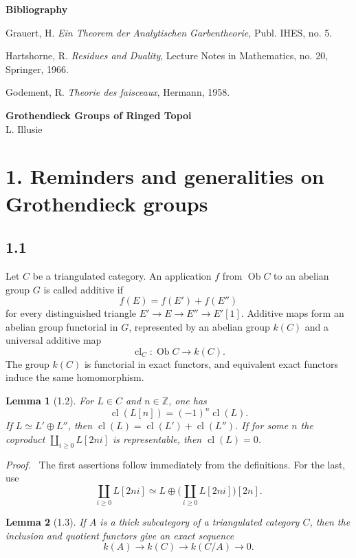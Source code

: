 \documentclass[11pt]{article}
\theoremstyle{plain}
\newtheorem*{lemma*}{Lemma}
\theoremstyle{definition}
\theoremstyle{remark}
\newenvironment{prooftext}{\par\noindent\textit{Proof.}\ }{\par\medskip}
\newcommand{\ZZ}{\mathbb Z}
\DeclareMathOperator{\ob}{Ob}
\DeclareMathOperator{\cl}{cl}
\begin{document}
\begin{center}
\textbf{Bibliography}
\end{center}
Grauert, H. \emph{Ein Theorem der Analytischen Garbentheorie}, Publ. IHES, no. 5.\par
Hartshorne, R. \emph{Residues and Duality}, Lecture Notes in Mathematics, no. 20, Springer, 1966.\par
Godement, R. \emph{Theorie des faisceaux}, Hermann, 1958.

\newpage
\begin{center}
{\Large\textbf{Grothendieck Groups of Ringed Topoi}}\\[0.35em]
{\large L. Illusie}
\end{center}

\section*{1. Reminders and generalities on Grothendieck groups}

\subsection*{1.1}
Let $C$ be a triangulated category. An application $f$ from $\ob C$ to an abelian group $G$ is called additive if
\[
f(E)=f(E')+f(E'')
\]
for every distinguished triangle $E'\to E\to E''\to E'[1]$. Additive maps form an abelian group functorial in $G$, represented by an abelian group $k(C)$ and a universal additive map
\[
\cl_C:\ob C\to k(C).
\]
The group $k(C)$ is functorial in exact functors, and equivalent exact functors induce the same homomorphism.

\begin{lemma*}[1.2]
For $L\in C$ and $n\in\ZZ$, one has
\[
\cl(L[n])=(-1)^n\cl(L).
\]
If $L\simeq L'\oplus L''$, then $\cl(L)=\cl(L')+\cl(L'')$. If for some $n$ the coproduct $\coprod_{i\ge0}L[2ni]$ is representable, then $\cl(L)=0$.
\end{lemma*}

\begin{prooftext}
The first assertions follow immediately from the definitions. For the last, use
\[
\coprod_{i\ge0}L[2ni]\simeq L\oplus\bigl(\coprod_{i\ge0}L[2ni]\bigr)[2n].
\]
\end{prooftext}

\begin{lemma*}[1.3]
If $A$ is a thick subcategory of a triangulated category $C$, then the inclusion and quotient functors give an exact sequence
\[
k(A)\longrightarrow k(C)\longrightarrow k(C/A)\longrightarrow0.
\]
\end{lemma*}
\end{document}

